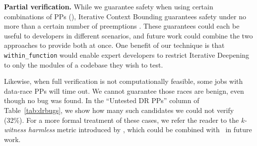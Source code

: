 
{\bf Partial verification.}
While we guarantee safety when using certain combinations of PPs (\sect{\ref{sec:eval-sssmc}}),
Iterative Context Bounding
guarantees safety under no more than a certain number of preemptions \cite{chess-icb}.
These guarantees could each be useful to developers in different scenarios,
and future work could combine the two approaches to provide both at once.
One benefit of our technique is that {\tt within\_function} %
would enable expert developers to
restrict Iterative Deepening to only the modules of a codebase they wish to test.

Likewise, when full verification is not computationally feasible,
some jobs with data-race PPs will time out.
We cannot guarantee those races are
benign, even though no bug was found.
In the ``Untested DR PPs'' column of Table~\ref{tab:drbugs}, we show how many such candidates we could not verify (32\%).
For a more formal treatment of these cases, we refer the reader to the {\em k-witness harmless} metric introduced by \cite{portend},
which could be combined with \quicksand~in future work.
